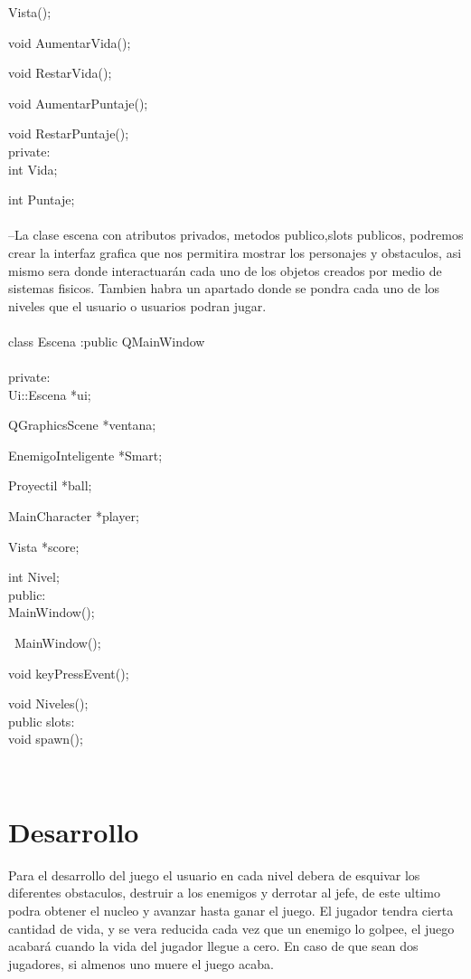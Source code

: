 \documentclass{article}
\begin{document}
    Vista();
    
    void AumentarVida();
    
    void RestarVida();
    
    void AumentarPuntaje();
    
    void RestarPuntaje();\\
private:\\

    int Vida;
    
    int Puntaje;\\
\rbrace\\

--La clase escena con atributos privados, metodos publico,slots publicos, podremos crear la interfaz grafica que nos permitira mostrar los personajes y obstaculos, asi mismo sera donde interactuarán cada uno de los objetos creados por medio de sistemas fisicos. Tambien habra un apartado donde se pondra cada uno de los niveles que el usuario o usuarios podran jugar.\\
\\
class Escena :public QMainWindow\\
\lbrace\\ 
private:\\

    Ui::Escena *ui;

    QGraphicsScene *ventana;

    EnemigoInteligente *Smart;

    Proyectil *ball;

    MainCharacter *player;

    Vista *score;

    int Nivel;\\
public:\\

    MainWindow();
    
    ~MainWindow();

    void keyPressEvent();
    
    void Niveles();\\
public slots:\\

    void spawn();

\rbrace\\

\section{Desarrollo}\label{intro}

Para el desarrollo del juego el usuario en cada nivel debera de esquivar los diferentes obstaculos, destruir a los enemigos y derrotar al jefe, de este ultimo podra obtener el nucleo y avanzar hasta ganar el juego. El jugador tendra cierta cantidad de vida, y se vera reducida cada vez que un enemigo lo golpee, el juego acabará cuando la vida del jugador llegue a cero. En caso de que sean dos jugadores, si almenos uno muere el juego acaba.
\end{document}
